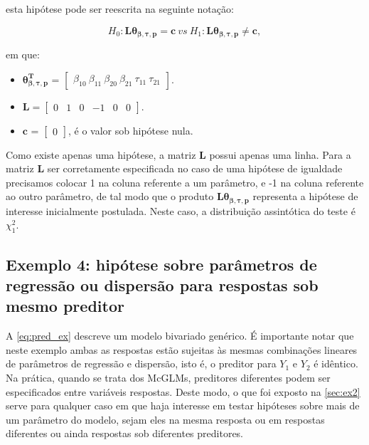 \noindent esta hipótese pode ser reescrita na seguinte notação:

$$H_0: \boldsymbol{L}\boldsymbol{\theta_{\beta,\tau,p}} = \boldsymbol{c} \ vs \ H_1: \boldsymbol{L}\boldsymbol{\theta_{\beta,\tau,p}} \neq \boldsymbol{c},$$ 

\noindent em que:

\begin{itemize}
  
  \item $\boldsymbol{\theta_{\beta,\tau,p}^T}$ = $\begin{bmatrix} \beta_{10} \  \beta_{11} \ \beta_{20} \ \beta_{21} \ \tau_{11} \ \tau_{21} \end{bmatrix}$.


\item $\boldsymbol{L} = \begin{bmatrix} 0 & 1 & 0 & -1 & 0 & 0  \end{bmatrix}.$
 
\item $\boldsymbol{c}$ = $\begin{bmatrix} 0 \end{bmatrix}$, é o valor sob hipótese nula. 

\end{itemize}

Como existe apenas uma hipótese, a matriz $\boldsymbol{L}$ possui apenas uma linha. Para a matriz $\boldsymbol{L}$ ser corretamente especificada no caso de uma hipótese de igualdade precisamos colocar 1 na coluna referente a um parâmetro, e -1 na coluna referente ao outro parâmetro, de tal modo que o produto $\boldsymbol{L}\boldsymbol{\theta_{\beta,\tau,p}}$ representa a hipótese de interesse inicialmente postulada. Neste caso, a distribuição assintótica do teste é $\chi^2_1$.

\subsection{Exemplo 4: hipótese sobre parâmetros de regressão ou dispersão para respostas sob mesmo preditor}

A \autoref{eq:pred_ex} descreve um modelo bivariado genérico. É importante notar que neste exemplo ambas as respostas estão sujeitas às mesmas combinações lineares de parâmetros de regressão e dispersão, isto é, o preditor para $Y_1$ e $Y_2$ é idêntico. Na prática, quando se trata dos McGLMs, preditores diferentes podem ser especificados entre variáveis respostas. Deste modo, o que foi exposto na \autoref{sec:ex2} serve para qualquer caso em que haja interesse em testar hipóteses sobre mais de um parâmetro do modelo, sejam eles na mesma resposta ou em respostas diferentes ou ainda respostas sob diferentes preditores. 

